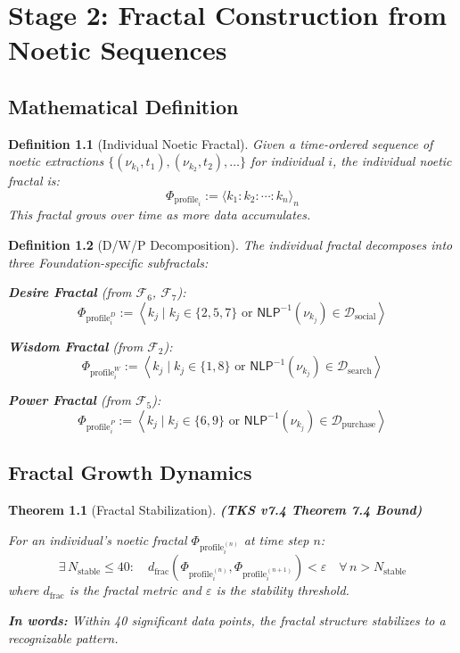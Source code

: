 \documentclass[11pt,twoside]{book}
\newcommand{\noe}[1]{\nu_{#1}}
\newcommand{\Foundations}{\mathcal{F}}
\newcommand{\NLP}{\mathsf{NLP}}
\newcommand{\DigitalTrace}{\mathcal{D}}
\newcommand{\ProfileFrac}{\Phi_{\mathrm{profile}}}
\newtheorem{definition}{Definition}[chapter]
\newtheorem{theorem}{Theorem}[chapter]
\begin{document}
\chapter{Stage 2: Fractal Construction from Noetic Sequences}
\label{ch:stage2-fractal}

\section{Mathematical Definition}

\begin{definition}[Individual Noetic Fractal]
\label{def:individual-fractal}
Given a time-ordered sequence of noetic extractions $\{(\noe{k_1}, t_1), (\noe{k_2}, t_2), \ldots\}$ for individual $i$, the \emph{individual noetic fractal} is:
\[
    \ProfileFrac_i := \langle k_1 : k_2 : \cdots : k_n \rangle_n
\]
This fractal grows over time as more data accumulates.
\end{definition}

\begin{definition}[D/W/P Decomposition]
\label{def:dwp-decomposition}
The individual fractal decomposes into three Foundation-specific subfractals:

\textbf{Desire Fractal} (from $\Foundations_6$, $\Foundations_7$):
\[
    \ProfileFrac_i^D := \left\langle k_j \mid k_j \in \{2, 5, 7\} \text{ or } \NLP^{-1}(\noe{k_j}) \in \DigitalTrace_{\text{social}} \right\rangle
\]

\textbf{Wisdom Fractal} (from $\Foundations_2$):
\[
    \ProfileFrac_i^W := \left\langle k_j \mid k_j \in \{1, 8\} \text{ or } \NLP^{-1}(\noe{k_j}) \in \DigitalTrace_{\text{search}} \right\rangle
\]

\textbf{Power Fractal} (from $\Foundations_5$):
\[
    \ProfileFrac_i^P := \left\langle k_j \mid k_j \in \{6, 9\} \text{ or } \NLP^{-1}(\noe{k_j}) \in \DigitalTrace_{\text{purchase}} \right\rangle
\]
\end{definition}

\section{Fractal Growth Dynamics}

\begin{theorem}[Fractal Stabilization]
\label{thm:fractal-stabilization}
\textbf{(TKS v7.4 Theorem 7.4 Bound)}

For an individual's noetic fractal $\ProfileFrac_i^{(n)}$ at time step $n$:
\[
    \exists\, N_{\mathrm{stable}} \leq 40 : \quad
    d_{\mathrm{frac}}\left(\ProfileFrac_i^{(n)}, \ProfileFrac_i^{(n+1)}\right) < \varepsilon
    \quad \forall\, n > N_{\mathrm{stable}}
\]
where $d_{\mathrm{frac}}$ is the fractal metric and $\varepsilon$ is the stability threshold.

\textbf{In words:} Within 40 significant data points, the fractal structure stabilizes to a recognizable pattern.
\end{theorem}
\end{document}
